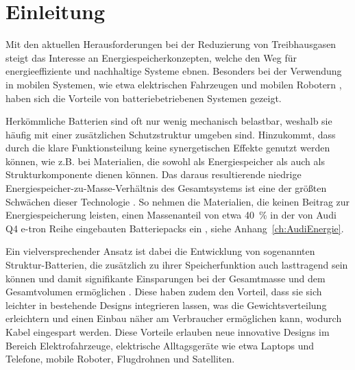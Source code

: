 \chapter[Einleitung]{\label{sec:Einleitung}Einleitung}
Mit den aktuellen Herausforderungen bei der Reduzierung von Treibhausgasen steigt das Interesse an Energiespeicherkonzepten, welche den Weg für energieeffiziente und nachhaltige Systeme ebnen. Besonders bei der Verwendung in mobilen Systemen, wie etwa elektrischen Fahrzeugen \cite{Huo2015,Donateo2015,Jochem2015,Kim2014,Orsi2016,Silva2011,Holdway2010,Sternberg2015,Ramachandran2015} und mobilen Robotern \cite{Hecht2023,Mikolajczyk2023,Ghobadpour2023,Wang2020}, haben sich die Vorteile von batteriebetriebenen Systemen gezeigt.

Herkömmliche Batterien sind oft nur wenig mechanisch belastbar, weshalb sie häufig mit einer zusätzlichen Schutzstruktur umgeben sind. Hinzukommt, dass durch die klare Funktionsteilung keine synergetischen Effekte genutzt werden können, wie z.B. bei Materialien, die sowohl als Energiespeicher als auch als Strukturkomponente dienen können. Das daraus resultierende niedrige Energiespeicher-zu-Masse-Verhältnis des Gesamtsystems ist eine der größten Schwächen dieser Technologie \cite{Armand2020,Schaefer2018,Cano2018,Goodenough2009}.
So nehmen die Materialien, die keinen Beitrag zur Energiespeicherung leisten, einen Massenanteil von etwa 40~\% in der von Audi Q4 e-tron Reihe eingebauten Batteriepacks ein \cite{Radu2021,Audi2022}, siehe Anhang~\ref{ch:AudiEnergie}. %

Ein vielversprechender Ansatz ist dabei die Entwicklung von sogenannten Struktur-Batterien, die zusätzlich zu ihrer Speicherfunktion auch lasttragend sein können \cite{Johannisson2018,Danzi2021,Wetzel2004, Thomas2004,Liu2009,Ekstedt2010,Wang2019,Asp2019, Moyer2020,Zhao2020, Yin2020,Wang2020,Lutkenhaus2020,Fu2021,Jin2021,Kalnaus2021,Wong2007,Carlson2013,Xu2022} und damit signifikante Einsparungen bei der Gesamtmasse und dem Gesamtvolumen ermöglichen \cite{Wetzel2004,Snyder2015,Carlstedt2020a,Asp2014,Johannisson2019}. Diese haben zudem den Vorteil, dass sie sich leichter in bestehende Designs integrieren lassen, was die Gewichtsverteilung erleichtern und einen Einbau näher am Verbraucher ermöglichen kann, wodurch Kabel eingespart werden. Diese Vorteile erlauben neue innovative Designs im Bereich Elektrofahrzeuge, elektrische Alltagsgeräte wie etwa Laptops und Telefone, mobile Roboter, Flugdrohnen und Satelliten.


